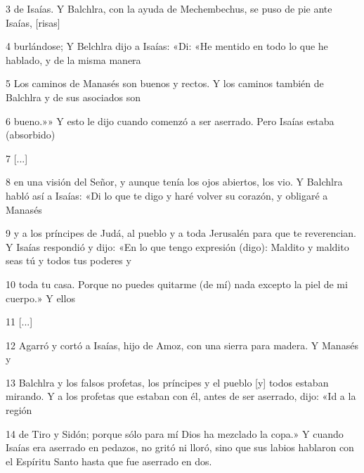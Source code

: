 \par 3 de Isaías. Y Balchlra, con la ayuda de Mechembechus, se puso de pie ante Isaías, [risas]

\par 4 burlándose; Y Belchlra dijo a Isaías: «Di: «He mentido en todo lo que he hablado, y de la misma manera

\par 5 Los caminos de Manasés son buenos y rectos. Y los caminos también de Balchlra y de sus asociados son

\par 6 bueno.»» Y esto le dijo cuando comenzó a ser aserrado. Pero Isaías estaba (absorbido)

\par 7 [...]

\par 8 en una visión del Señor, y aunque tenía los ojos abiertos, los vio. Y Balchlra habló así a Isaías: «Di lo que te digo y haré volver su corazón, y obligaré a Manasés

\par 9 y a los príncipes de Judá, al pueblo y a toda Jerusalén para que te reverencian. Y Isaías respondió y dijo: «En lo que tengo expresión (digo): Maldito y maldito seas tú y todos tus poderes y

\par 10 toda tu casa. Porque no puedes quitarme (de mí) nada excepto la piel de mi cuerpo.» Y ellos

\par 11 [...]

\par 12 Agarró y cortó a Isaías, hijo de Amoz, con una sierra para madera. Y Manasés y

\par 13 Balchlra y los falsos profetas, los príncipes y el pueblo [y] todos estaban mirando. Y a los profetas que estaban con él, antes de ser aserrado, dijo: «Id a la región

\par 14 de Tiro y Sidón; porque sólo para mí Dios ha mezclado la copa.» Y cuando Isaías era aserrado en pedazos, no gritó ni lloró, sino que sus labios hablaron con el Espíritu Santo hasta que fue aserrado en dos.

